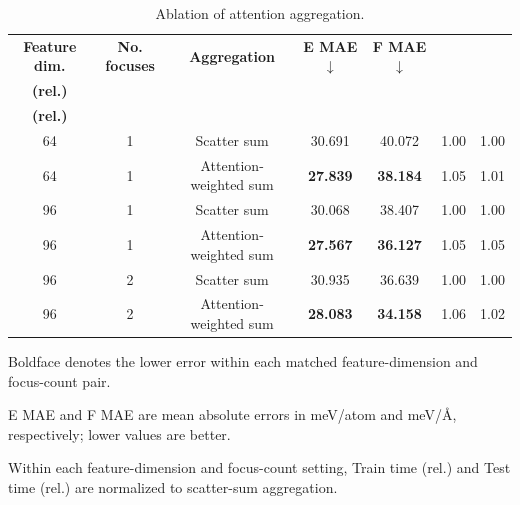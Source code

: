 \begin{table}[ht]
    \PaperTableStyle
    \begin{threeparttable}
        \caption{Ablation of attention aggregation.}
        \label{tab:dpa4_attention_ablation}
        \begin{tabular*}{\linewidth}{@{\extracolsep{\fill}}ccccccc@{}}
            \toprule
            \textbf{Feature dim.}                  &
            \textbf{No. focuses}                   &
            \textbf{Aggregation}                   &
            \textbf{E MAE}$\downarrow$\tnote{a}    &
            \textbf{F MAE}$\downarrow$\tnote{a}    &
            \makecell{\textbf{Train time}\\\textbf{(rel.)}}$\downarrow$\tnote{b} &
            \makecell{\textbf{Test time}\\\textbf{(rel.)}}$\downarrow$\tnote{b}                                                            \\
            \midrule
            64                                     & 1 & Scatter sum            & 30.691          & 40.072          & 1.00 & 1.00 \\
            64                                     & 1 & Attention-weighted sum & \textbf{27.839} & \textbf{38.184} & 1.05 & 1.01 \\
            \midrule
            96                                     & 1 & Scatter sum            & 30.068          & 38.407          & 1.00 & 1.00 \\
            96                                     & 1 & Attention-weighted sum & \textbf{27.567} & \textbf{36.127} & 1.05 & 1.05 \\
            \midrule
            96                                     & 2 & Scatter sum            & 30.935          & 36.639          & 1.00 & 1.00 \\
            96                                     & 2 & Attention-weighted sum & \textbf{28.083} & \textbf{34.158} & 1.06 & 1.02 \\
            \bottomrule
        \end{tabular*}
        \begin{tablenotes}[flushleft]
            \PaperTableNotesStyle
            \item[] Boldface denotes the lower error within each matched feature-dimension and focus-count pair.
            \item[a] E MAE and F MAE are mean absolute errors in meV/atom and meV/\AA, respectively; lower values are better.
            \item[b] Within each feature-dimension and focus-count setting, Train time (rel.) and Test time (rel.) are normalized to scatter-sum aggregation.
        \end{tablenotes}
    \end{threeparttable}
\end{table}

